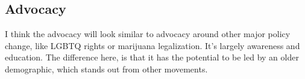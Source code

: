 \documentclass{proposalnsf}
\begin{document}
\subsection{Advocacy}
I think the advocacy will look similar to advocacy around other major policy change, like LGBTQ rights or marijuana legalization. It's largely awareness and education. The difference here, is that it has the potential to be led by an older demographic, which stands out from other movements.




\newpage
{}
\renewcommand{\thepage} {E--\arabic{page}}



\newpage
{}
\renewcommand{\thepage} {G--\arabic{page}}
\end{document}
